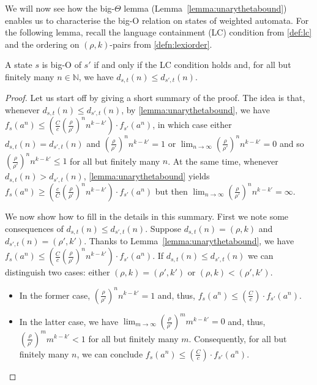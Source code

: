 \documentclass{lmcs}
\theoremstyle{plain}
\theoremstyle{definition}
\theoremstyle{remark}
\newcommand\dgf{d}
\renewcommand\nu{f}
\begin{document}
We will now see how the big-$\Theta$ lemma (Lemma~\ref{lemma:unarythetabound})
enables us to characterise the big-O relation on states of weighted automata.
For the following lemma, recall the language containment (LC) condition from \cref{def:lc} and the ordering on $(\rho,k)$-pairs from \cref{defn:lexiorder}.

\begin{lem} \label{lem:boundedff}
A state $s$ is big-O of $s'$ if and only if the LC condition holds and, for all but finitely many $n \in \mathbb{N}$, we have $\dgf_{s,t}(n) \le \dgf_{s',t}(n)$.
\end{lem}

\begin{proof}
Let us start off by giving a short summary of the proof.
The idea is that, whenever $\dgf_{s,t}(n) \le \dgf_{s',t}(n)$, by \cref{lemma:unarythetabound},
we have $\nu_s(a^n) \le (\frac{C}{c}(\frac{\rho}{\rho'})^n n^{k-k'})\cdot\nu_{s'}(a^n) $, in which case either $\dgf_{s,t}(n) = \dgf_{s',t}(n)$ and $(\frac{\rho}{\rho'})^n n^{k-k'} =  1$ or $\lim_{n\to\infty}(\frac{\rho}{\rho'})^n n^{k-k'} = 0$ and so $(\frac{\rho}{\rho'})^n n^{k-k'} \le 1$ for all but finitely many $n$.
At the same time, whenever $\dgf_{s,t}(n) > \dgf_{s',t}(n)$, \cref{lemma:unarythetabound} yields $\nu_s(a^n) \ge (\frac{c}{C}(\frac{\rho}{\rho'})^n n^{k-k'})\cdot\nu_{s'}(a^n)$ but then $\lim_{n\to\infty}(\frac{\rho}{\rho'})^n n^{k-k'}= \infty$.

We now show how to fill in the details in this summary.
First we note some consequences of $\dgf_{s,t}(n) \le \dgf_{s',t}(n)$.
Suppose  $\dgf_{s,t}(n) = (\rho,k)$ and $\dgf_{s',t}(n) = (\rho',k')$. Thanks to Lemma~\ref{lemma:unarythetabound},
we have $\nu_s(a^n) \le (\frac{C}{c}(\frac{\rho}{\rho'})^n n^{k-k'})\cdot\nu_{s'}(a^n) $.
If $\dgf_{s,t}(n) \le \dgf_{s',t}(n)$ we can distinguish two cases: either  $(\rho,k)= (\rho',k')$ or $(\rho,k)<(\rho',k')$.
\begin{itemize}
\item In the former case, $(\frac{\rho}{\rho'})^n n^{k-k'} = 1$ and, thus,  ${\nu_s(a^n)} \le (\frac{C}{c})\cdot {\nu_{s'}(a^n)}$.
\item In the latter case, we have $\lim_{m\to\infty} (\frac{\rho}{\rho'})^m m^{k-k'}=0$ and, thus, $(\frac{\rho}{\rho'})^m m^{k-k'} < 1$ for
all but finitely many  $m$. Consequently, for all but finitely many $n$, we can conclude ${\nu_s(a^n)} \le (\frac{C}{c})\cdot {\nu_{s'}(a^n)}$.
\end{itemize}


\end{proof}
\end{document}
